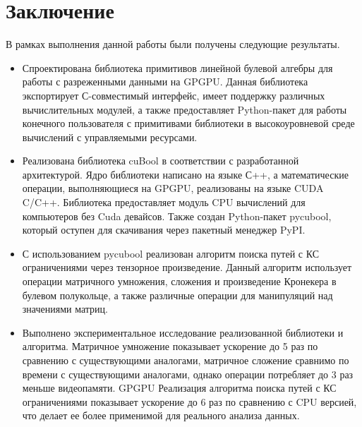 \section{Заключение}

В рамках выполнения данной работы были получены следующие результаты.

\begin{itemize}
    \item Спроектирована библиотека примитивов линейной булевой алгебры для работы с разреженными данными на GPGPU. 
    Данная библиотека экспортирует С-совместимый интерфейс, имеет поддержку различных вычислительных модулей, а также предоставляет Python-пакет для работы конечного пользователя с примитивами библиотеки в высокоуровневой среде вычислений с управляемыми ресурсами.

    \item Реализована библиотека cuBool в соответствии с разработанной архитектурой. 
    Ядро библиотеки написано на языке С++, а математические операции, выполняющиеся на GPGPU, реализованы на языке CUDA C/C++. Библиотека предоставляет модуль CPU вычислений для компьютеров без Cuda девайсов. 
    Также создан Python-пакет pycubool, который оступен для скачивания через пакетный менеджер PyPI.
    
    \item С использованием pycubool реализован алгоритм поиска путей с КС ограничениями через тензорное произведение. 
    Данный алгоритм использует операции матричного умножения, сложения и произведение Кронекера в булевом полукольце, а также различные операции для манипуляций над значениями матриц. 
   
    
    \item Выполнено экспериментальное исследование реализованной библиотеки и алгоритма.
    Матричное умножение показывает ускорение до 5 раз по сравнению с существующими аналогами, 
    матричное сложение сравнимо по времени с существующими аналогами, 
    однако операции потребляет до 3 раз меньше видеопамяти. 
    GPGPU Реализация алгоритма поиска путей с КС ограничениями показывает ускорение до 6 раз по сравнению с CPU версией, что делает ее более применимой для реального анализа данных.
\end{itemize}

